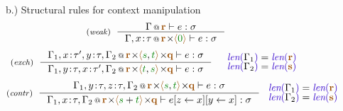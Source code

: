 \begin{figure}[t]
{\small b.) Structural rules for context manipulation}
\begin{equation*}
\tyrule{weak}
  {\coctx{\Gamma}{ \aclrd{\textbf{r}} } \vdash e : \sigma}
  {\coctx{\Gamma,x \!:\! \tau}{\aclrd{\textbf{r}} \cons \alift{ \cclrd{0} }} \vdash e : \sigma} 
\end{equation*}
\begin{equation*}
\tyrule{exch}
  {\coctx{\Gamma_1,x\!:\!\tau',y\!:\!\tau,\Gamma_2}{\aclrd{\textbf{r}} \cons\alift{\cclrd{s},\cclrd{t}} \cons \aclrd{\textbf{q}}} \vdash e : \sigma}
  {\coctx{\Gamma_1,y\!:\!\tau,x\!:\!\tau',\Gamma_2}{\aclrd{\textbf{r}} \cons\alift{\cclrd{t},\cclrd{s}} \cons \aclrd{\textbf{q}}} \vdash e : \sigma}
\quad
\begin{array}{l}
\slen{\Gamma_1} = \slen{\aclrd{\textbf{r}}}\\[-0.25em]
\slen{\Gamma_2} = \slen{\aclrd{\textbf{s}}}
\end{array}
\end{equation*}
\begin{equation*}
\tyrule{contr}
  {\coctx{\Gamma_1,y\!:\!\tau,z\!:\!\tau,\Gamma_2}{\aclrd{\textbf{r}} \cons \alift{\cclrd{s},\cclrd{t}} \cons \aclrd{\textbf{q}}} \vdash e : \sigma}
  {\coctx{\Gamma_1,x\!:\!\tau,\Gamma_2}{\aclrd{\textbf{r}} \cons \alift{\cclrd{s}+\cclrd{t}} \cons \aclrd{\textbf{q}}} \vdash \subst{\subst{e}{z}{x}}{y}{x} : \sigma}
~
\begin{array}{l}
\slen{\Gamma_1} = \slen{\aclrd{\textbf{r}}}\\[-0.25em]
\slen{\Gamma_2} = \slen{\aclrd{\textbf{s}}}
\end{array}
\end{equation*}

\label{fig:applications-struct-bll}
\vspace{-1em}
\end{figure}


